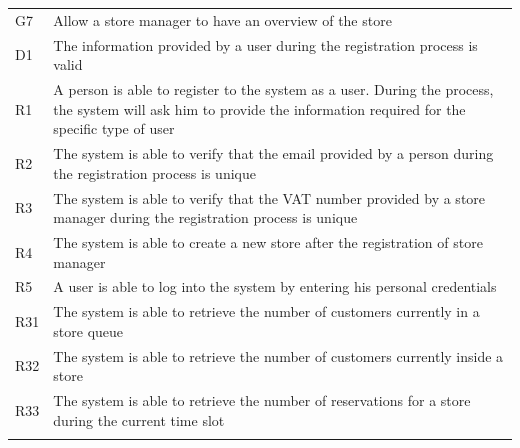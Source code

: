 \begin{longtable}[]{@{}
  >{\raggedright\arraybackslash}p{}
  >{\raggedright\arraybackslash}p{}@{}}
\toprule
G7 & Allow a store manager to have an overview of the
store \\ \addlinespace
\midrule
\endhead
D1 & The information provided by a user during the registration process
is valid \\ \addlinespace
R1 & A person is able to register to the system as a user. During the
process, the system will ask him to provide the information required for
the specific type of user \\ \addlinespace
R2 & The system is able to verify that the email provided by a person
during the registration process is unique \\ \addlinespace
R3 & The system is able to verify that the VAT number provided by a
store manager during the registration process is unique \\ \addlinespace
R4 & The system is able to create a new store after the registration of
store manager \\ \addlinespace
R5 & A user is able to log into the system by entering his personal
credentials \\ \addlinespace
R31 & The system is able to retrieve the number of customers currently
in a store queue \\ \addlinespace
R32 & The system is able to retrieve the number of customers currently
inside a store \\ \addlinespace
R33 & The system is able to retrieve the number of reservations for a
store during the current time slot \\ \addlinespace
\bottomrule
\end{longtable}

